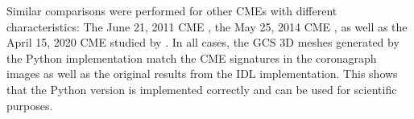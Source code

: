 Similar comparisons were performed for other \acp{CME}  with different characteristics: The June 21, 2011 \ac{CME} \citep[originally reconstructed by][Table 1]{Heinemann-2019}, the May 25, 2014 \ac{CME} \citep[originally reconstructed by][Figure 5b]{Dumbovic2018-ForbMod}, as well as the April 15, 2020 \ac{CME} studied by \citet{Forstner-2021-SolO}. In all cases, the \ac{GCS} 3D meshes generated by the Python implementation match the \ac{CME} signatures in the coronagraph images as well as the original results from the \ac{IDL} implementation. This shows that the Python version is implemented correctly and can be used for scientific purposes.
